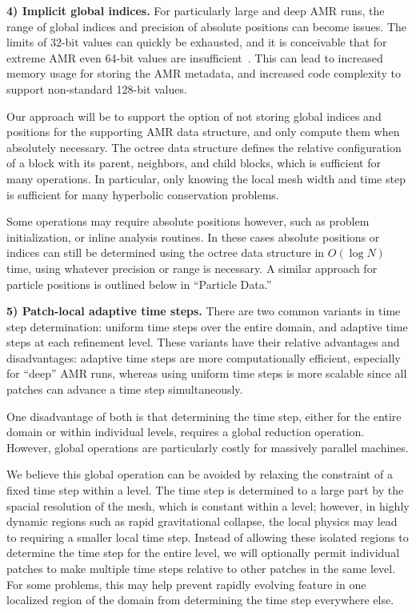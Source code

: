 \documentclass[11pt,letterpaper]{article}
\begin{document}
\textbf{4) Implicit global indices.}  For particularly large and deep
AMR runs, the range of global indices and precision of absolute
positions can become issues.  The limits of 32-bit values can quickly
be exhausted, and it is conceivable that for extreme AMR even 64-bit
values are insufficient~\cite{@@@abel-abel-128bit}.  This can lead to
increased memory usage for storing the AMR metadata, and increased
code complexity to support non-standard 128-bit values.

Our approach will be to support the option of not storing global
indices and positions for the supporting AMR data structure, and only
compute them when absolutely necessary.  The octree data structure
defines the relative configuration of a block with its parent,
neighbors, and child blocks, which is sufficient for many operations.
In particular, only knowing the local mesh width and time step is
sufficient for many hyperbolic conservation problems.

Some operations may require absolute positions however, such as
problem initialization, or inline analysis routines.  In these cases
absolute positions or indices can still be determined using the octree
data structure in $O(\log N)$ time, using whatever precision or range
is necessary.  A similar approach for particle positions is outlined
below in ``Particle Data.''



\textbf{5) Patch-local adaptive time steps.} There are two common
variants in time step determination: uniform time steps over the
entire domain, and adaptive time steps at each refinement level.
These variants have their relative advantages and disadvantages:
adaptive time steps are more computationally efficient, especially for
``deep'' AMR runs, whereas using uniform time steps is more scalable
since all patches can advance a time step simultaneously.

One disadvantage of both is that determining the time step, either for
the entire domain or within individual levels, requires a global
reduction operation.  However, global operations are particularly
costly for massively parallel machines.

We believe this global operation can be avoided by relaxing the
constraint of a fixed time step within a level.  The time step is
determined to a large part by the spacial resolution of the mesh,
which is constant within a level; however, in highly dynamic regions
such as rapid gravitational collapse, the local physics may lead to
requiring a smaller local time step.  Instead of allowing these
isolated regions to determine the time step for the entire level, we
will optionally permit individual patches to make multiple time steps
relative to other patches in the same level.  For some problems, this
may help prevent rapidly evolving feature in one localized region of
the domain from determining the time step everywhere else.
\end{document}
